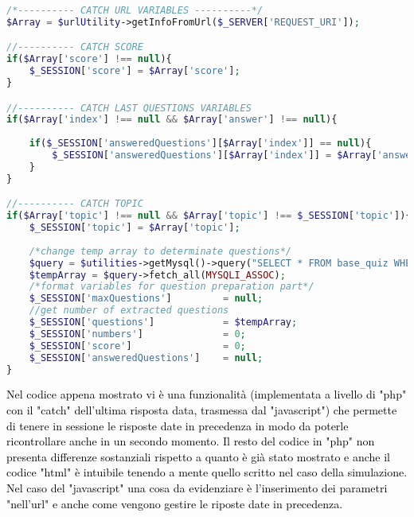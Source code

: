 \begin{lstlisting}[language=php]
/*---------- CATCH URL VARIABLES ----------*/
$Array = $urlUtility->getInfoFromUrl($_SERVER['REQUEST_URI']);

//---------- CATCH SCORE
if($Array['score'] !== null){
	$_SESSION['score'] = $Array['score'];
}

//---------- CATCH LAST QUESTIONS VARIABLES
if($Array['index'] !== null && $Array['answer'] !== null){
	
	if($_SESSION['answeredQuestions'][$Array['index']] == null){
		$_SESSION['answeredQuestions'][$Array['index']] = $Array['answer']; 
	} 
}

//---------- CATCH TOPIC 
if($Array['topic'] !== null && $Array['topic'] !== $_SESSION['topic']){
	$_SESSION['topic'] = $Array['topic'];
	
	/*change temp array to determinate questions*/
	$query = $utilities->getMysql()->query("SELECT * FROM base_quiz WHERE (topic = '{$Array['topic']}')");
	$tempArray = $query->fetch_all(MYSQLI_ASSOC);
	/*format variables for question preparation part*/
	$_SESSION['maxQuestions']         = null;
	//get number of extracted questions
	$_SESSION['questions']            = $tempArray;
	$_SESSION['numbers']              = 0;
	$_SESSION['score']                = 0;
	$_SESSION['answeredQuestions']    = null;
}
\end{lstlisting}

\textcolor{black}{Nel codice appena mostrato vi è una funzionalità (implementata a livello di "php" con il "catch" dell'ultima risposta data, trasmessa dal "javascript") che permette di tenere in sessione le risposte date in precedenza in modo da poterle ricontrollare anche in un secondo momento. Il resto del codice in "php" non presenta differenze sostanziali rispetto a quanto è già stato mostrato  e anche il codice "html" è intuibile tenendo a mente quello scritto nel caso della simulazione.\\
Nel caso del "javascript" una cosa da evidenziare è l'inserimento dei parametri "nell'url" e anche come vengono gestire le riposte date in precedenza.}\\

